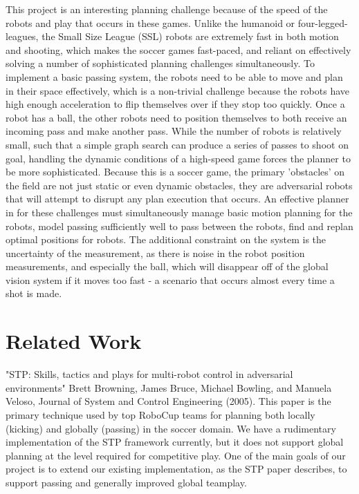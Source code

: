 \documentclass[a4paper, 10pt, conference]{ieeeconf}      %
\begin{document}
This project is an interesting planning challenge because of the speed of the robots and play that occurs in these games. Unlike the humanoid or four-legged-leagues, the Small Size League (SSL) robots are extremely fast in both motion and shooting, which makes the soccer games fast-paced, and reliant on effectively solving a number of sophisticated planning challenges simultaneously. To implement a basic passing system, the robots need to be able to move and plan in their space effectively, which is a non-trivial challenge because the robots have high enough acceleration to flip themselves over if they stop too quickly. Once a robot has a ball, the other robots need to position themselves to both receive an incoming pass and make another pass. While the number of robots is relatively small, such that a simple graph search can produce a series of passes to shoot on goal, handling the dynamic conditions of a high-speed game forces the planner to be more sophisticated. Because this is a soccer game, the primary 'obstacles' on the field are not just static or even dynamic obstacles, they are adversarial robots that will attempt to disrupt any plan execution that occurs. An effective planner in for these challenges must simultaneously manage basic motion planning for the robots, model passing sufficiently well to pass between the robots, find and replan optimal positions for robots. The additional constraint on the system is the uncertainty of the measurement, as there is noise in the robot position measurements, and especially the ball, which will disappear off of the global vision system if it moves too fast - a scenario that occurs almost every time a shot is made. 

\section{Related Work}
"STP: Skills, tactics and plays for multi-robot control in adversarial environments" Brett Browning, James Bruce, Michael Bowling, and Manuela Veloso, Journal of System and Control Engineering (2005). This paper is the primary technique used by top RoboCup teams for planning both locally (kicking) and globally (passing) in the soccer domain. We have a rudimentary implementation of the STP framework currently, but it does not support global planning at the level required for competitive play. One of the main goals of our project is to extend our existing implementation, as the STP paper describes, to support passing and generally improved global teamplay.
\end{document}
